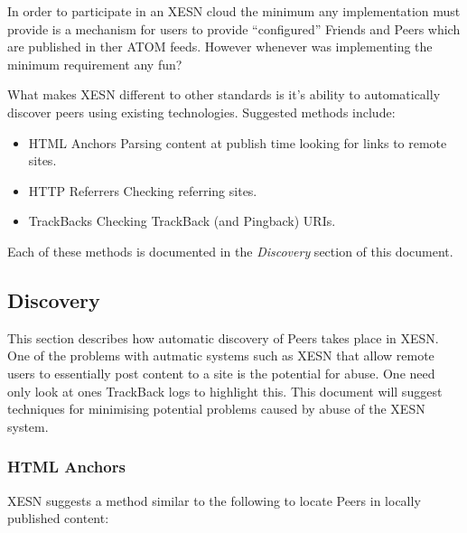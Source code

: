 \documentclass[titlepage,english,a4paper,twoside,dvips]{article}
\begin{document}
In order to participate in an XESN cloud the minimum any implementation must provide is a mechanism for users to provide ``configured'' Friends and Peers which are published in ther ATOM feeds.  However whenever was implementing the minimum requirement any fun?

What makes XESN different to other standards is it's ability to automatically discover peers using existing technologies.  Suggested methods include:

\begin{itemize}

\item{HTML Anchors} Parsing content at publish time looking for links to remote sites.

\item{HTTP Referrers} Checking referring sites.

\item{TrackBacks} Checking TrackBack (and Pingback) URIs.

\end{itemize}

Each of these methods is documented in the \emph{Discovery} section of this document. 

\subsection{Discovery}

This section describes how automatic discovery of Peers takes place in XESN.  One of the problems with autmatic systems such as XESN that allow remote users to essentially post content to a site is the potential for abuse.  One need only look at ones TrackBack logs to highlight this.  This document will suggest techniques for minimising potential problems caused by abuse of the XESN system.

\subsubsection{HTML Anchors}

XESN suggests a method similar to the following to locate Peers in locally published content:
\end{document}
